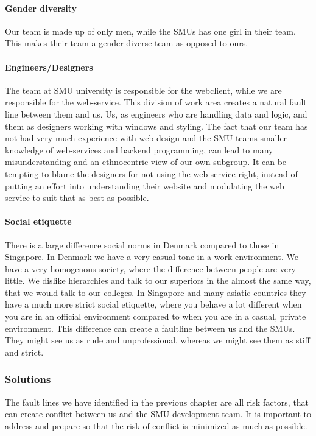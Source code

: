 \documentclass[a4paper,11pt,report]{article}
\begin{document}
\paragraph{Gender diversity}
Our team is made up of only men, while the SMUs has one girl in their team. This makes their team a gender diverse team as opposed to ours.

\paragraph{Engineers/Designers}
The team at SMU university is responsible for the webclient, while we are responsible for the web-service. This division of work area creates a natural fault line between them and us. Us, as engineers who are handling data and logic, and them as designers working with windows and styling. The fact that our team has not had very much experience with web-design and the SMU teams smaller knowledge of web-services and backend programming, can lead to many misunderstanding and an ethnocentric view of our own subgroup. It can be tempting to blame the designers for not using the web service right, instead of putting an effort into understanding their website and modulating the web service to suit that as best as possible.

\paragraph{Social etiquette}
There is a large difference social norms in Denmark compared to those in Singapore. In Denmark we have a very casual tone in a work environment. We have a very homogenous society, where the difference between people are very little. We dislike hierarchies and talk to our superiors in the almost the same way, that we would talk to our colleges. In Singapore and many asiatic countries they have a much more strict social etiquette, where you behave a lot different when you are in an official environment compared to when you are in a casual, private environment. This difference can create a faultline between us and the SMUs. They might see us as rude and unprofessional, whereas we might see them as stiff and strict. 

\subsubsection{Solutions}
The fault lines we have identified in the previous chapter are all risk factors, that can create conflict between us and the SMU development team. It is important to address and prepare so that the risk of conflict is minimized as much as possible.
\end{document}

